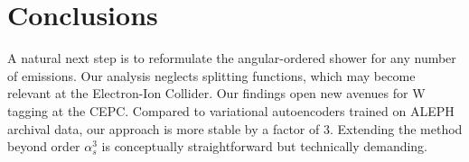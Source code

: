 \section{Conclusions}\label{sec:conclusions}

A natural next step is to reformulate the angular-ordered shower for any
number of emissions. Our analysis neglects splitting functions, which
may become relevant at the Electron-Ion Collider. Our findings open new
avenues for W tagging at the CEPC. Compared to variational autoencoders
trained on ALEPH archival data, our approach is more stable by a factor
of 3. Extending the method beyond order $\alpha_s^3$ is conceptually
straightforward but technically demanding.

